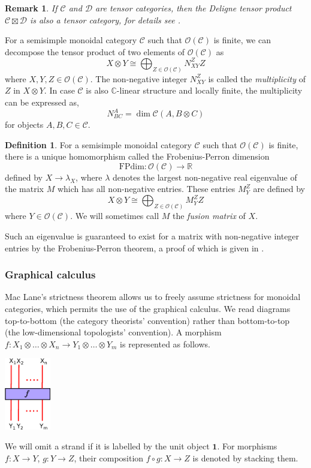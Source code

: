 \documentclass[a4paper, 10pt]{book}
\newtheorem{Rem}[theorem]{Remark}
\theoremstyle{definition}
\newtheorem{Def}[theorem]{Definition}
\numberwithin{equation}{chapter}
\newcommand\ot{\otimes}
\newcommand\FPdim{\text{FPdim}}
\newcommand\R{\mathbb R}
\newcommand\kk{\mathbb C}
\newcommand\C{\mathcal C}
\newcommand\OO{\mathcal O}
\newcommand\D{\mathcal D}
\newcommand{\ra}\rightarrow
\newcommand\one{\mathbf{1}}
\begin{document}
\begin{Rem}\rm
If $\C$ and $\D$ are tensor categories, then the Deligne tensor product $\C\boxtimes\D$ is also a tensor category, for details see \cite[Section 4.6]{EGNO}.
\end{Rem}
For a semisimple monoidal category $\C$ such that $\OO(\C)$ is finite, we can decompose the tensor product of two elements of $\OO(\C)$ as 
\begin{equation*}
	X \otimes Y \cong \bigoplus_{Z\in \OO (\C) } N^Z_{XY} Z 
\end{equation*} where $X, Y, Z \in \OO(\C)$. The non-negative integer $N^Z_{XY}$  is called the \textit{multiplicity} of $Z$ in $X\ot Y$. 
In case $\C$ is also $\kk$-linear structure and locally finite, the multiplicity can be expressed as, \begin{equation*}
	N^A_{BC} = \dim \C(A, B\ot C)
\end{equation*} for objects $A, B, C \in \C$.
\begin{Def}
For a semisimple monoidal category $\C$ such that $\OO(\C)$ is finite, there is a unique homomorphism called the Frobenius-Perron dimension \begin{equation*}
	\FPdim: \OO(\C) \rightarrow \R
\end{equation*}  
defined by $X\rightarrow \lambda_X$, where $\lambda$ denotes the largest non-negative real eigenvalue of the matrix $M$ which has all non-negative entries. These entries $M^Z_{Y}$ are defined by \begin{equation}\label{fusionrule}
	X \otimes Y \cong \bigoplus_{Z\in \OO (\C) } M^Z_{Y} Z 
\end{equation} 
where $Y \in \OO(\C)$. We will sometimes call $M$ the \textit{fusion matrix} of $X$.
\end{Def} Such an eigenvalue is guaranteed to exist for a matrix with non-negative integer entries by the Frobenius-Perron theorem, a proof of which is given in \cite[Theorem 3.2.1]{EGNO}.\\

\subsubsection{Graphical calculus}\label{graphicalcalculus}
Mac Lane's strictness theorem allows us to freely assume strictness for monoidal categories, which permits the use of the graphical calculus. We read diagrams top-to-bottom (the category theorists' convention) rather than bottom-to-top (the low-dimensional topologists' convention).
A morphism $f:X_1\ot\dots\ot X_n\ra Y_1\ot\dots\ot Y_m$ is represented as follows.
\begin{center}
\includegraphics[width=0.15\textwidth]{morphnew.eps}
\end{center}
We will omit a strand if it is labelled by the unit object $\one$.
For morphisms $f:X\ra Y$, $g:Y\ra Z$, their composition $f\circ g: X\ra Z$ is denoted by stacking them.
\end{document}
